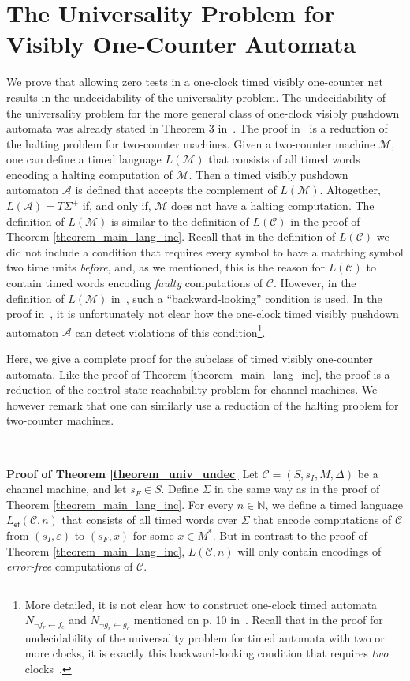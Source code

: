 \documentclass{CSML}
\theoremstyle{plain}\newtheorem{theorem}[thm]{Theorem}
\theoremstyle{plain}\newtheorem{corollary}[thm]{Corollary}
\theoremstyle{plain}\newtheorem{example}[thm]{Example}
\theoremstyle{plain}\newtheorem{lemma}[thm]{Lemma}
\theoremstyle{plain}\newtheorem{remark}[thm]{Remark}
\newcommand{\N}{\mathbb{N}}
\newcommand{\A}{\mathcal{A}}
\newcommand{\tcm}{\mathcal{M}}
\newcommand{\cm}{\mathcal{C}}
\begin{document}
		\section{The Universality Problem for Visibly One-Counter Automata}
		We prove that allowing zero tests in a one-clock timed visibly one-counter net results in the undecidability of the universality problem.
		The undecidability of the universality problem for the more general class of one-clock visibly pushdown automata was already stated in Theorem 3 in~\cite{EmmiM06}.
		The proof in~\cite{EmmiM06} is a reduction of the halting problem for two-counter machines. 
		Given a two-counter machine $\tcm$, 
		one can define a timed language $L(\tcm)$ that consists of all timed words encoding a halting computation of $\tcm$. 
		Then a timed visibly pushdown automaton $\A$ is defined that accepts the complement of $L(\tcm)$. 
		Altogether, $L(\A)=T\Sigma^+$ if, and only if, $\tcm$ does not have a halting computation. 
		The definition of $L(\tcm)$ is similar to the definition of $L(\cm)$ in the proof of Theorem \ref{theorem_main_lang_inc}. 
		Recall that in the definition of $L(\cm)$ we did not include a condition that requires every symbol to have a matching symbol two time units \emph{before}, and, as we mentioned, 
		this is the reason for $L(\cm)$ to contain timed words encoding \emph{faulty} computations of $\cm$. 
		However, in the definition of $L(\tcm)$ in~\cite{EmmiM06}, such a ``backward-looking'' condition is used. In the proof in~\cite{EmmiM06}, it is unfortunately not clear how the  one-clock timed visibly pushdown automaton $\A$ can detect violations of this condition\footnote{More detailed, it is not clear how to construct one-clock timed automata $N_{\neg f_r \leftarrow f_c}$ and $N_{\neg g_r\leftarrow g_c}$ mentioned on p. 10 in~\cite{EmmiM06}. Recall that in the proof for undecidability of the universality problem for timed automata with two or more clocks, it is exactly this backward-looking condition that requires \emph{two} clocks~\cite{DBLP:conf/formats/AdamsOW07}.}. 
		
		Here, we give a complete proof for the subclass of timed visibly one-counter automata. 
		Like the proof of Theorem \ref{theorem_main_lang_inc}, the proof is a reduction of the control state reachability problem for channel machines. 
		We however remark that one can similarly use a reduction of the halting problem for two-counter machines.  		
		
		\
	
		\noindent
		{\bf Proof of Theorem \ref{theorem_univ_undec}} 
		Let $\cm=(S,s_I,M,\Delta)$ be a channel machine, and let $s_F\in S$. 
		Define $\Sigma$ in the same way as in the proof of Theorem \ref{theorem_main_lang_inc}.
		For every $n\in\N$, we define a timed language $L_{\mathsf{ef}}(\cm,n)$
		that 
		consists of all timed words over $\Sigma$ that encode computations of $\cm$ from $(s_I,\varepsilon)$ to $(s_F,x)$ for some $x\in M^*$. But in contrast to the proof of Theorem \ref{theorem_main_lang_inc}, 
		$L(\cm,n)$ will only contain encodings of \emph{error-free} computations of $\cm$. 
		
\end{document}
